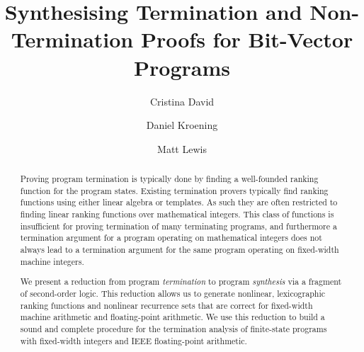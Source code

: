 \documentclass[a4paper]{llncs}
\begin{document}
\setlength{\pdfpageheight}{\paperheight}
\setlength{\pdfpagewidth}{\paperwidth}





\title{Synthesising Termination and Non-Termination Proofs for Bit-Vector Programs}

\author{Cristina David\and Daniel Kroening\and Matt Lewis}




\maketitle

\begin{abstract}
%
Proving program termination is typically done by finding a well-founded
ranking function for the program states.  Existing termination
provers typically find ranking functions using either linear algebra or
templates.  As such they are often restricted to finding linear ranking
functions over mathematical integers.  This class of functions is
insufficient for proving termination of many terminating programs, and
furthermore a termination argument for a program operating on mathematical
integers does not always lead to a termination argument for the same program
operating on fixed-width machine integers.

We present a reduction from program \emph{termination} to program
\emph{synthesis} via a fragment of second-order logic.  This reduction
allows us to generate nonlinear, lexicographic ranking functions and
nonlinear recurrence sets that are correct for fixed-width machine arithmetic
and floating-point arithmetic.  We use this reduction to build a sound and
complete procedure for the termination analysis of finite-state programs with fixed-width
integers and IEEE floating-point arithmetic.
%
\end{abstract}
\end{document}
